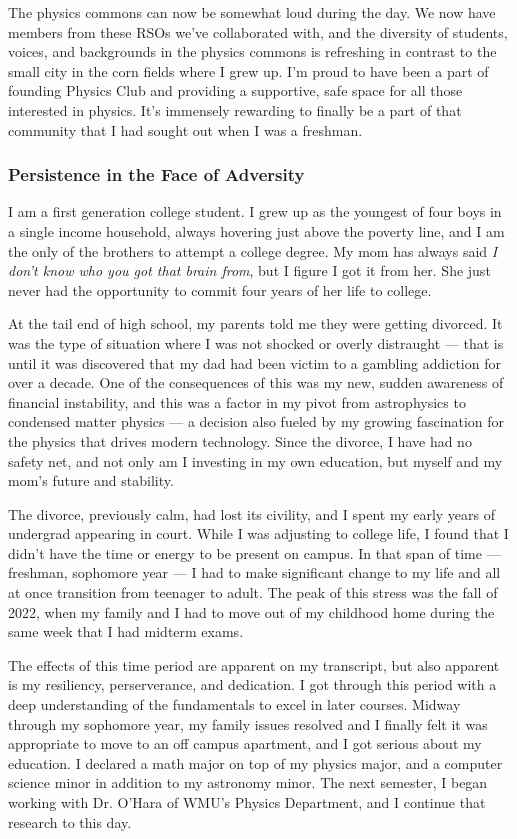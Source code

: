 \documentclass[11pt]{article}
\begin{document}
The physics commons can now be somewhat loud during the day. We now have members from these RSOs we've collaborated with, and the diversity of students, voices, and backgrounds in the physics commons is refreshing in contrast to the small city in the corn fields where I grew up. I'm proud to have been a part of founding Physics Club and providing a supportive, safe space for all those interested in physics. It's immensely rewarding to finally be a part of that community that I had sought out when I was a freshman.
\subsubsection*{Persistence in the Face of Adversity}
I am a first generation college student. I grew up as the youngest of four boys in a single income household, always hovering just above the poverty line, and I am the only of the brothers to attempt a college degree. My mom has always said \textit{I don't know who you got that brain from}, but I figure I got it from her. She just never had the opportunity to commit four years of her life to college.

At the tail end of high school, my parents told me they were getting divorced. It was the type of situation where I was not shocked or overly distraught --- that is until it was discovered that my dad had been victim to a gambling addiction for over a decade. One of the consequences of this was my new, sudden awareness of financial instability, and this was a factor in my pivot from astrophysics to condensed matter physics --- a decision also fueled by my growing fascination for the physics that drives modern technology. Since the divorce, I have had no safety net, and not only am I investing in my own education, but myself and my mom's future and stability.

The divorce, previously calm, had lost its civility, and I spent my early years of undergrad appearing in court. While I was adjusting to college life, I found that I didn't have the time or energy to be present on campus. In that span of time --- freshman, sophomore year --- I had to make significant change to my life and all at once transition from teenager to adult. The peak of this stress was the fall of 2022, when my family and I had to move out of my childhood home during the same week that I had midterm exams.

The effects of this time period are apparent on my transcript, but also apparent is my resiliency, perserverance, and dedication. I got through this period with a deep understanding of the fundamentals to excel in later courses. Midway through my sophomore year, my family issues resolved and I finally felt it was appropriate to move to an off campus apartment, and I got serious about my education. I declared a math major on top of my physics major, and a computer science minor in addition to my astronomy minor. The next semester, I began working with Dr. O'Hara of WMU's Physics Department, and I continue that research to this day.
\end{document}
